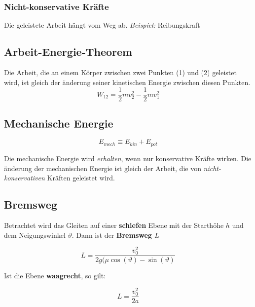 \documentclass[7pt]{article}
\begin{document}
\begin{multicols*}{3}
\subsubsection{Nicht-konservative Kr{\"a}fte}
Die geleistete Arbeit h{\"a}ngt vom Weg ab. \newline
\emph{Beispiel:} Reibungskraft

\subsection{Arbeit-Energie-Theorem}

Die Arbeit, die an einem K{\"o}rper zwischen zwei Punkten (1) und (2) geleistet wird, ist gleich der {\"a}nderung seiner kinetischen Energie zwischen diesen Punkten.
\begin{equation*}
	W_{12} = \frac{1}{2}mv_2^2 - \frac{1}{2}mv_1^2
\end{equation*}

\subsection{Mechanische Energie}

\begin{equation*}
	E_{mech} \equiv E_{kin} + E_{pot}
\end{equation*}

Die mechanische Energie wird \emph{erhalten}, wenn nur konservative Kr{\"a}fte wirken. \newline
Die {\"a}nderung der mechanischen Energie ist gleich der Arbeit, die von \emph{nicht-konservativen} Kr{\"a}ften geleistet wird.

\subsection{Bremsweg}

Betrachtet wird das Gleiten auf einer \textbf{schiefen} Ebene mit der Starth{\"o}he $h$ und dem Neigungswinkel $\vartheta$. Dann ist der \textbf{Bremsweg $L$}

\begin{equation*}
	L = \frac{v_0^2}{2g(\mu\cos(\vartheta) - \sin(\vartheta)}
\end{equation*}

Ist die Ebene \textbf{waagrecht}, so gilt:

\begin{equation*}
	L = \frac{v_0^2}{2a}
\end{equation*}

\end{multicols*}
\end{document}
